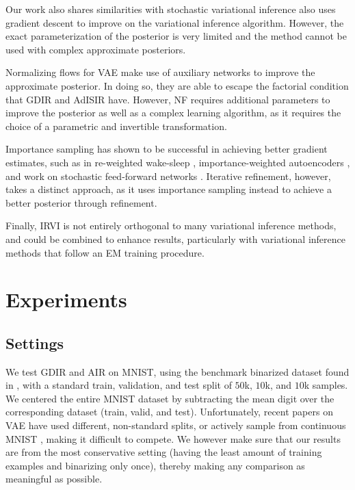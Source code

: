 \documentclass{article} %
\begin{document}
Our work also shares similarities with stochastic variational inference
\citep{hoffman2013stochastic} also uses gradient descent to improve on the
variational inference algorithm. However, the exact parameterization of the
posterior is very limited and the method cannot be used with complex approximate
posteriors. 

Normalizing flows for VAE \citep[NF]{rezende2015variational} make use of auxiliary
networks to improve the approximate posterior. In doing so, they are able to
escape the factorial condition that GDIR and AdISIR have. However, NF requires
additional parameters to improve the posterior as well as a complex learning
algorithm, as it requires the choice of a parametric and invertible transformation.

Importance sampling has shown to be successful in achieving better gradient
estimates, such as in re-weighted wake-sleep \citep[RWS,
][]{bornschein2014reweighted}, importance-weighted autoencoders
\citep[IWAE,][]{burda2015importance}, and work on stochastic feed-forward
networks \citep[SFFN, ][]{tang2013learning}. Iterative refinement, however, takes a distinct approach, as it uses
importance sampling instead to achieve a better posterior through refinement.

Finally, IRVI is not entirely orthogonal to many variational inference methods, and could be combined to enhance results, particularly with variational inference methods that follow an EM training procedure.

\section{Experiments}

\subsection{Settings}

We test GDIR and AIR on MNIST, using the benchmark binarized dataset found in
\citep{salakhutdinov2008quantitative}, with a standard train, validation, and
test split of $50$k, $10$k, and $10$k samples. We centered the entire MNIST dataset by subtracting the mean digit over the corresponding dataset (train, valid, and test). Unfortunately, recent papers on
VAE \citep{mnih2014neural, salimans2014markov} have used different, non-standard
splits, or actively sample from continuous MNIST \citep{burda2015importance},
making it difficult to compete. We however make sure that our results are from
the most conservative setting (having the least amount of training examples and
binarizing only once),
thereby making any comparison as meaningful as possible.
\end{document}
